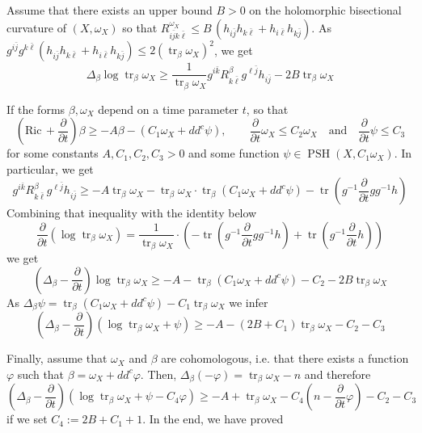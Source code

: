 \documentclass[a4paper,11pt,leqno,english]{smfart}
\theoremstyle{plain}
\theoremstyle{plain}
\numberwithin{equation}{section} %
\numberwithin{figure}{section} %
\theoremstyle{plain}
\theoremstyle{plain}
\theoremstyle{remark}
\theoremstyle{remark}
\theoremstyle{definition}
\theoremstyle{plain}
\theoremstyle{plain}
\theoremstyle{definition}
\newcommand{\om}{\omega}
\newcommand{\Ric}{\mathrm{Ric} \,}
\renewcommand{\ge}{\geq}
\renewcommand{\le}{\leq}
\newcommand{\tr}{\operatorname{tr}}
\newcommand{\PSH}{\operatorname{PSH}}
\begin{document}
Assume that there exists an upper bound $B>0$ on the holomorphic bisectional curvature of $(X,\omega_X)$ so that 
$
R^{\om_X}_{i\bar j k \bar \ell} \le B\, (h_{i\bar j}h_{k \bar \ell}+h_{i\bar \ell}h_{k \bar j}).
$
 As $g^{i \bar j}g^{k\bar \ell}(h_{i\bar j}h_{k \bar \ell}+h_{i\bar \ell}h_{k \bar j}) \le 2 (\tr_{\beta}\om_X)^2$, 
 we get 
\[
\Delta_{\beta} \log \tr_{\beta}\om_X \ge \frac{1}{\tr_\beta \om_X}  g^{i \bar k} R^{\beta}_{k \bar \ell} g^{\ell \bar j}h_{i\bar j}
-2B \tr_{\beta}\om_X
\]

If the forms $\beta,\omega_X$ depend on a time parameter $t$, so that
\[
(\Ric +\frac{\partial}{\partial t})\beta \ge - A \beta-(C_1\om_X+dd^c \psi), \qquad \frac{\partial}{\partial t}\om_X \le C_2 \om_X \quad \mbox{and} \quad \frac{\partial}{\partial t}\psi \le C_3
\]
for some constants $A,C_1,C_2,C_3>0$ and some function $\psi \in \PSH(X,C_1\om_X)$. In particular, we get
\[ g^{i \bar k} R^{\beta}_{k \bar \ell} g^{\ell \bar j}h_{i\bar j} \ge -A\tr_\beta \om_X - \tr_\beta \om_X \cdot \tr_\beta(C_1\om_X+dd^c\psi)-\tr(g^{-1}\frac{\partial}{\partial t}gg^{-1}h)\]
Combining that inequality with the identity below 
\[\frac{\partial}{\partial t}(\log \tr_{\beta}\om_X)=\frac{1}{\tr_\beta \om_X}\cdot (-\tr(g^{-1}\frac{\partial}{\partial t}gg^{-1}h)+\tr(g^{-1}\frac{\partial}{\partial t}h))\]
we get
\[ (\Delta_{\beta}-\frac{\partial}{\partial t}) \log \tr_{\beta}\om_X \ge-A-\tr_\beta(C_1\om_X+dd^c \psi) -C_2-2B\tr_{\beta}\om_X \]
As 
$\Delta_\beta \psi =\tr_\beta(C_1\om_X+dd^c\psi)-C_1\tr_\beta \om_X$
we infer 
\[ (\Delta_{\beta}-\frac{\partial}{\partial t})( \log \tr_{\beta}\om_X+\psi) \ge-A-(2B+C_1)\tr_\beta\om_X -C_2-C_3 \]

Finally, assume that $\omega_X$ and $\beta$ are cohomologous, i.e. that there exists a function $\varphi$ such that $\beta=\om_X+dd^c \varphi$. Then, 
$\Delta_\beta(-\varphi)=\tr_\beta \om_X - n$
and therefore  
\[ (\Delta_{\beta}-\frac{\partial}{\partial t})( \log \tr_{\beta}\om_X+\psi-C_4\varphi) \ge-A+\tr_\beta\om_X -C_4(n-\frac{\partial}{\partial t}\varphi)-C_2-C_3 \]
if we set $C_4:=2B+C_1+1$.
In the end, we have proved
\end{document}
